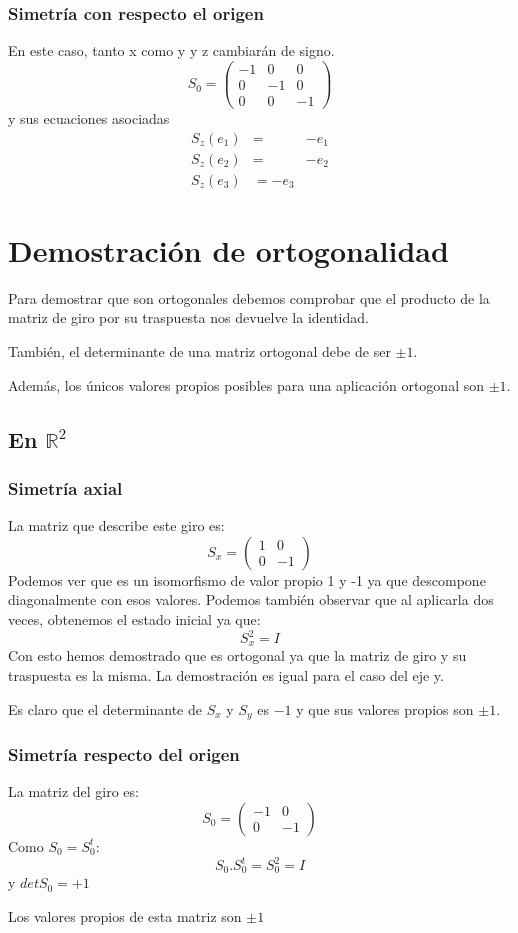 \documentclass [a4paper,12pt]{article}
\begin{document}
\subsubsection{Simetría con respecto el origen}
En este caso, tanto x como y y z cambiarán de signo.
$$
S_0=\begin{pmatrix}
-1&0 &0\\
0&-1&0\\
0&0&-1
\end{pmatrix}
$$
y sus ecuaciones asociadas
\begin{eqnarray}
S_z(e_1)& = & -e_1 \\
S_z (e_2)& = & -e_2\\
S_z (e_3)&= -e_3
\end{eqnarray}
\section{Demostración de ortogonalidad}
Para demostrar que son ortogonales debemos comprobar que el producto de la matriz de giro por su traspuesta nos devuelve la identidad.\par
También, el determinante de una matriz ortogonal debe de ser $\pm1$.\par
Además, los únicos valores propios posibles para una aplicación ortogonal son $\pm1$.

\subsection{En  $\mathbb{R}^2$}
\subsubsection{Simetría axial}
La matriz que describe este giro es: 
$$
S_x=\begin{pmatrix}
1&0\\
0&-1
\end{pmatrix}
$$
Podemos ver que es un isomorfismo de valor propio 1 y -1 ya que descompone diagonalmente con esos valores. Podemos también observar que al aplicarla dos veces, obtenemos el estado inicial ya que:
$$ S_x^2=I$$
Con esto hemos demostrado que es ortogonal ya que la matriz de giro y su traspuesta es la misma.
La demostración es igual para el caso del eje y. \par
Es claro que el determinante de $S_x$ y $S_y$ es $-1$ y que sus valores propios son $\pm1$.
\subsubsection{Simetría respecto del origen}
La matriz del giro es:
$$
S_0=\begin{pmatrix}
-1&0\\
0&-1
\end{pmatrix}
$$
Como $S_0=S^t_0$:
$$
S_0.S^t_0=S^2_0=I
$$
y $det S_0=+1$\par
Los valores propios de esta matriz son $\pm1$
\end{document}
